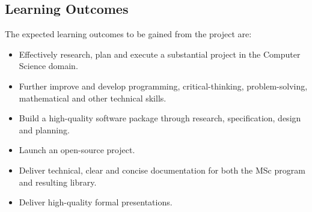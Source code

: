 \begin{requirements}
\subsection{Learning Outcomes}
The expected learning outcomes to be gained from the project are:
\begin{itemize}
    \item Effectively research, plan and execute a substantial project in the Computer Science domain.
    \item Further improve and develop programming, critical-thinking, problem-solving, mathematical and other technical skills.
    \item Build a high-quality software package through research, specification, design and planning.
    \item Launch an open-source project.
    \item Deliver technical, clear and concise documentation for both the MSc program and resulting library.
    \item Deliver high-quality formal presentations.
\end{itemize}
\end{requirements}
\vspace{1cm}
\clearpage